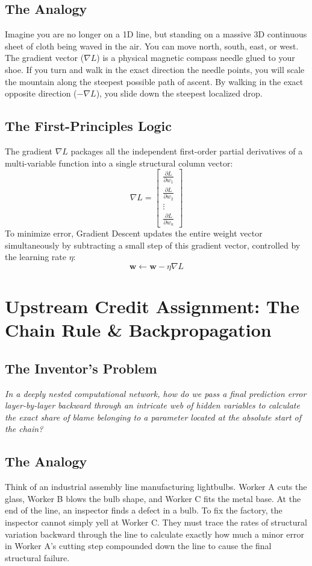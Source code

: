 \documentclass[12pt,a4paper]{article}
\begin{document}
\subsection*{The Analogy}
Imagine you are no longer on a 1D line, but standing on a massive 3D continuous sheet of cloth being waved in the air. You can move north, south, east, or west. The gradient vector ($\nabla L$) is a physical magnetic compass needle glued to your shoe. If you turn and walk in the exact direction the needle points, you will scale the mountain along the steepest possible path of ascent. By walking in the exact opposite direction ($-\nabla L$), you slide down the steepest localized drop.

\subsection*{The First-Principles Logic}
The gradient $\nabla L$ packages all the independent first-order partial derivatives of a multi-variable function into a single structural column vector:
$$\nabla L = \begin{bmatrix} \frac{\partial L}{\partial w_1} \\ \frac{\partial L}{\partial w_2} \\ \vdots \\ \frac{\partial L}{\partial w_n} \end{bmatrix}$$
To minimize error, Gradient Descent updates the entire weight vector simultaneously by subtracting a small step of this gradient vector, controlled by the learning rate $\eta$:
$$\mathbf{w} \leftarrow \mathbf{w} - \eta \nabla L$$

\newpage
\section{Upstream Credit Assignment: The Chain Rule \& Backpropagation}
\subsection*{The Inventor's Problem}
\textit{In a deeply nested computational network, how do we pass a final prediction error layer-by-layer backward through an intricate web of hidden variables to calculate the exact share of blame belonging to a parameter located at the absolute start of the chain?}

\subsection*{The Analogy}
Think of an industrial assembly line manufacturing lightbulbs. Worker A cuts the glass, Worker B blows the bulb shape, and Worker C fits the metal base. At the end of the line, an inspector finds a defect in a bulb. To fix the factory, the inspector cannot simply yell at Worker C. They must trace the rates of structural variation backward through the line to calculate exactly how much a minor error in Worker A's cutting step compounded down the line to cause the final structural failure.
\end{document}
